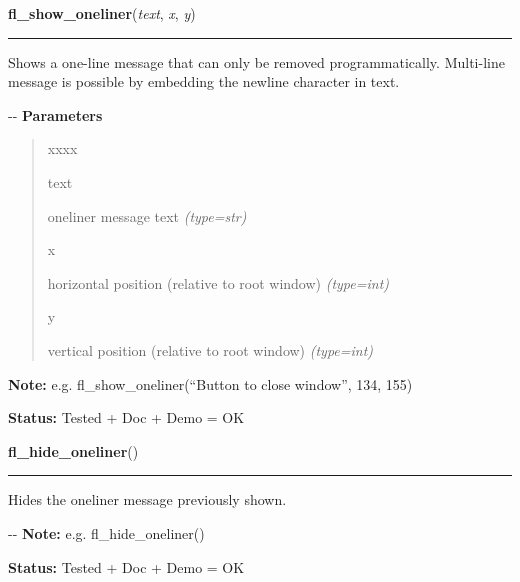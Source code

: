 \hspace{.8\funcindent}\begin{boxedminipage}{\funcwidth}

    \raggedright \textbf{fl\_show\_oneliner}(\textit{text}, \textit{x}, \textit{y})

    \vspace{-1.5ex}

    \rule{\textwidth}{0.5\fboxrule}
\setlength{\parskip}{2ex}

Shows a one-line message that can only be removed programmatically.
Multi-line message is possible by embedding the newline character in text.

-{}-
\setlength{\parskip}{1ex}
      \textbf{Parameters}
      \vspace{-1ex}

      \begin{quote}
        \begin{Ventry}{xxxx}

          \item[text]


oneliner message text
            {\it (type=str)}

          \item[x]


horizontal position (relative to root window)
            {\it (type=int)}

          \item[y]


vertical position (relative to root window)
            {\it (type=int)}

        \end{Ventry}

      \end{quote}

\textbf{Note:} 
e.g. fl\_show\_oneliner(``Button to close window'', 134, 155)


\textbf{Status:} 
Tested + Doc + Demo = OK


    \end{boxedminipage}

    \label{xformslib:flgoodies:fl_hide_oneliner}

    \vspace{0.5ex}

\hspace{.8\funcindent}\begin{boxedminipage}{\funcwidth}

    \raggedright \textbf{fl\_hide\_oneliner}()

    \vspace{-1.5ex}

    \rule{\textwidth}{0.5\fboxrule}
\setlength{\parskip}{2ex}

Hides the oneliner message previously shown.

-{}-
\setlength{\parskip}{1ex}
\textbf{Note:} 
e.g. fl\_hide\_oneliner()


\textbf{Status:} 
Tested + Doc + Demo = OK


    \end{boxedminipage}

